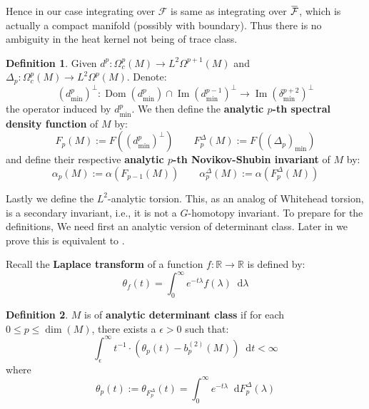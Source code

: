 \documentclass[11pt]{report}
\theoremstyle{definition}
\newtheorem{Def}{Definition}[chapter]
\theoremstyle{plain}
\DeclareMathOperator{\im}{Im}
\DeclareMathOperator{\dom}{Dom}
\newcommand{\real}{\mathbb{R}}
\newcommand{\overbar}[1]{\mkern 1.5mu\overline{\mkern-1.5mu#1\mkern-1.5mu}\mkern 1.5mu}
\renewcommand{\bar}{\overbar}
\newcommand{\mass}[1]{\mathop{}\mathrm{d}{#1}}
\begin{document}
Hence in our case integrating over $\mathcal{F}$ is same as integrating over $\bar{\mathcal{F}}$, which is actually a compact manifold (possibly with boundary). Thus there is no ambiguity in the heat kernel not being of trace class.
\begin{Def}\label{2.64}
Given $d^p:\Omega^p_c(M)\to L^2\Omega^{p+1}(M)$ and $\Delta_p: \Omega_c^p(M)\to L^2\Omega^p(M)$. Denote:
\begin{equation*}
(d^p_{\min})^\perp: \dom(d^p_{\min})\cap \im (d^{p-1}_{\min})^\perp \to \im(\delta^{p+2}_{\min})^\perp 
\end{equation*}	
the operator induced by $d^p_{\min}$. We then define the \textbf{analytic $p$-th spectral density function} of $M$ by:
\begin{equation*}
F_p(M):=F((d^p_{\min})^\perp) \qquad F^\Delta_p(M):=F((\Delta_p)_{\min})
\end{equation*}
and define their respective \textbf{analytic $p$-th Novikov-Shubin invariant} of $M$ by:
\begin{equation*}
\alpha_p(M):=\alpha(F_{p-1}(M)) \qquad \alpha_p^{\Delta}(M):=\alpha(F^\Delta_p(M))
\end{equation*}
\end{Def}
Lastly we define the $L^2$-analytic torsion. This, as an analog of Whitehead torsion, is a secondary invariant, i.e., it is not a $G$-homotopy invariant. To prepare for the definitions, We need first an analytic version of determinant class. Later in  we prove this is equivalent to . 
\par Recall the \textbf{Laplace transform} of a function $f:\real\to \real$ is defined by:
\begin{equation}
\theta_f(t)=\int_{0}^{\infty}e^{-t\lambda}f(\lambda)\mass{\lambda}
\end{equation}
\begin{Def}\label{3.128}
	$M$ is of \textbf{analytic determinant class} if for each $0\leq p\leq \dim (M)$, there exists a $\epsilon>0$ such that:
	\begin{equation}
	\int_{\epsilon}^{\infty}t^{-1}\cdot (\theta_p(t)-b_p^{(2)}(M))\mass{t} <\infty
	\end{equation}
	where
	\begin{equation}
	\theta_p(t):=\theta_{F^{\Delta}_p}(t)=\int_{0}^{\infty}e^{-t\lambda}\mass{F^\Delta_p(\lambda)}
	\end{equation}
\end{Def}
\end{document}
